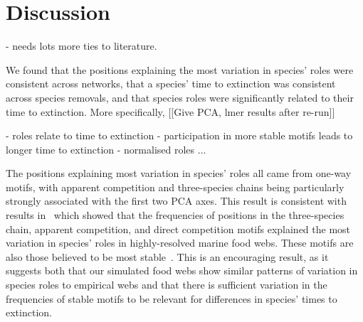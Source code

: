 \documentclass[12pt]{article}
\begin{document}







\section{Discussion}

	- needs lots more ties to literature.


	We found that the positions explaining the most variation in species' roles were consistent across networks, that a species' time to extinction was consistent across species removals, and that species roles were significantly related to their time to extinction. More specifically, [[Give PCA, lmer results after re-run]]


	- roles relate to time to extinction
	- participation in more stable motifs leads to longer time to extinction
	- normalised roles ... 


	The positions explaining most variation in species' roles all came from one-way motifs, with apparent competition and three-species chains being particularly strongly associated with the first two PCA axes. This result is consistent with results in~\citet{Cirtwill2018EcolLett} which showed that the frequencies of positions in the three-species chain, apparent competition, and direct competition motifs explained the most variation in species' roles in highly-resolved marine food webs. These motifs are also those believed to be most stable~\citep{Stouffer2007,Borrelli2015a}. This is an encouraging result, as it suggests both that our simulated food webs show similar patterns of variation in species roles to empirical webs and that there is sufficient variation in the frequencies of stable motifs to be relevant for differences in species' times to extinction.
\end{document}
